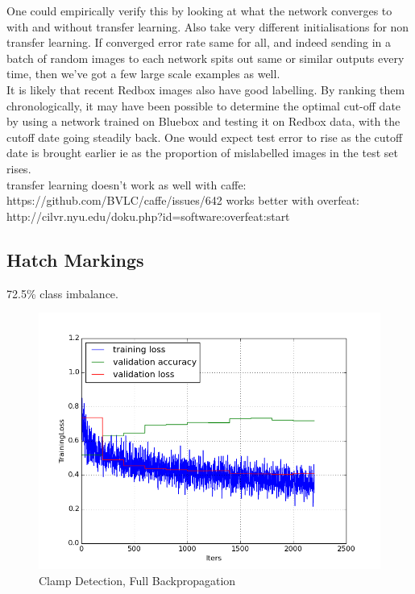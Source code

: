 \documentclass[a4paper,11pt]{article}
\begin{document}
One could empirically verify this by looking at what the network converges to with and without transfer learning. Also take very different initialisations for non transfer learning. If converged error rate same for all, and indeed sending in a batch of random images to each network spits out same or similar outputs every time, then we've got a few large scale examples as well. \\

It is likely that recent Redbox images also have good labelling. By ranking them chronologically, it may have been possible to determine the optimal cut-off date by using a network trained on Bluebox and testing it on Redbox data, with the cutoff date going steadily back. One would expect test error to rise as the cutoff date is brought earlier ie as the proportion of mislabelled images in the test set rises. \\

transfer learning doesn't work as well with caffe:
https://github.com/BVLC/caffe/issues/642
works better with overfeat: http://cilvr.nyu.edu/doku.php?id=software:overfeat:start


\subsection{Hatch Markings}

72.5\% class imbalance. 



\begin{figure}[h!]
	\centering
	\includegraphics[scale=0.5]{images/plot_hatch_markings_noneC.png}
	\caption{Clamp Detection, Full Backpropagation}
\end{figure}
\end{document}
